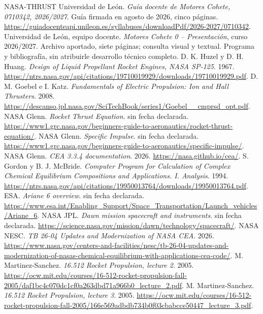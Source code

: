 \begin{thebibliography}{NASA-THRUST}
 Universidad de León. \emph{Guía docente de Motores Cohete, 0710342, 2026/2027}. Guía firmada en agosto de 2026, cinco páginas. \url{https://guiadocenteapi.unileon.es/syllabuses/downloadPdf/2026-2027/0710342}.
 Universidad de León, equipo docente. \emph{Motores Cohete 0 -- Presentación}, curso 2026/2027. Archivo aportado, siete páginas; consulta visual y textual. Programa y bibliografía, sin atribuirle desarrollo técnico completo.
 D. K. Huzel y D. H. Huang. \emph{Design of Liquid Propellant Rocket Engines, NASA SP-125}. 1967. \url{https://ntrs.nasa.gov/api/citations/19710019929/downloads/19710019929.pdf}.
 D. M. Goebel e I. Katz. \emph{Fundamentals of Electric Propulsion: Ion and Hall Thrusters}. 2008. \url{https://descanso.jpl.nasa.gov/SciTechBook/series1/Goebel__cmprsd_opt.pdf}.
 NASA Glenn. \emph{Rocket Thrust Equation}. sin fecha declarada. \url{https://www1.grc.nasa.gov/beginners-guide-to-aeronautics/rocket-thrust-equation/}.
 NASA Glenn. \emph{Specific Impulse}. sin fecha declarada. \url{https://www1.grc.nasa.gov/beginners-guide-to-aeronautics/specific-impulse/}.
 NASA Glenn. \emph{CEA 3.3.4 documentation}. 2026. \url{https://nasa.github.io/cea/}.
 S. Gordon y B. J. McBride. \emph{Computer Program for Calculation of Complex Chemical Equilibrium Compositions and Applications. I. Analysis}. 1994. \url{https://ntrs.nasa.gov/api/citations/19950013764/downloads/19950013764.pdf}.
 ESA. \emph{Ariane 6 overview}. sin fecha declarada. \url{https://www.esa.int/Enabling_Support/Space_Transportation/Launch_vehicles/Ariane_6}.
 NASA JPL. \emph{Dawn mission spacecraft and instruments}. sin fecha declarada. \url{https://science.nasa.gov/mission/dawn/technology/spacecraft/}.
 NASA NESC. \emph{TB 26-04 Updates and Modernization of NASA CEA}. 2026. \url{https://www.nasa.gov/centers-and-facilities/nesc/tb-26-04-updates-and-modernization-of-nasas-chemical-equilibrium-with-applications-cea-code/}.
 M. Martinez-Sanchez. \emph{16.512 Rocket Propulsion, lecture 2}. 2005. \url{https://ocw.mit.edu/courses/16-512-rocket-propulsion-fall-2005/daf1bc4c070dc1cf0a263dbd71a966b0_lecture_2.pdf}.
 M. Martinez-Sanchez. \emph{16.512 Rocket Propulsion, lecture 3}. 2005. \url{https://ocw.mit.edu/courses/16-512-rocket-propulsion-fall-2005/166e569adbdb734b0f03cbabcce50447_lecture_3.pdf}.

\end{thebibliography}
